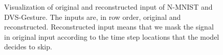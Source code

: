 




\begin{figure}[t]
    \vspace{-5pt}
    \caption{Visualization of original and reconstructed input of N-MNIST and DVS-Gesture. 
The inputs are, in row order, original and reconstructed. 
Reconstructed input means that we mask the signal in original input according to the time step locations that the model decides to skip.}
\label{fig:recon}
\vspace{-10pt}
\end{figure}



